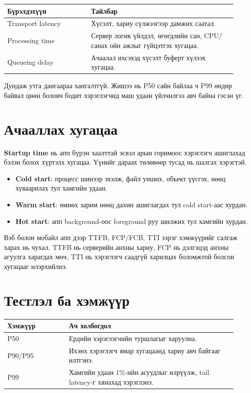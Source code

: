 \documentclass[10pt,a4paper,twocolumn]{article}
\begin{document}
\begin{tabular}{@{}p{0.34\linewidth}p{0.59\linewidth}@{}}
\toprule
\textbf{Бүрэлдэхүүн} & \textbf{Тайлбар} \\
\midrule
Transport latency & Хүсэлт, хариу сүлжээгээр дамжих саатал. \\
Processing time & Сервер логик үйлдэл, өгөгдлийн сан, CPU/санах ойн ажлыг гүйцэтгэх хугацаа. \\
Queueing delay & Ачаалал ихсэхэд хүсэлт буферт хүлээх хугацаа. \\
\bottomrule
\end{tabular}

Дундаж утга дангаараа хангалтгүй. Жишээ нь P50 сайн байлаа ч P99 өндөр байвал цөөн боловч бодит хэрэглэгчид маш удаан үйлчилгээ авч байна гэсэн үг.

\section{Ачааллах хугацаа}
\textbf{Startup time} нь апп бүрэн хаалттай эсвэл арын горимоос хэрэглэгч ашиглахад бэлэн болох хүртэлх хугацаа. Үүнийг дараах төлөвөөр тусад нь шалгах хэрэгтэй.

\begin{itemize}
  \item \textbf{Cold start}: процесс шинээр эхэлж, файл унших, объект үүсгэх, нөөц хуваарилах тул хамгийн удаан.
  \item \textbf{Warm start}: өмнөх зарим нөөц дахин ашиглагдах тул cold start-аас хурдан.
  \item \textbf{Hot start}: апп background-оос foreground руу шилжих тул хамгийн хурдан.
\end{itemize}

Вэб болон мобайл апп дээр TTFB, FCP/FCB, TTI зэрэг хэмжүүрийг салгаж харах нь чухал. TTFB нь серверийн анхны хариу, FCP нь дэлгэцэд анхны агуулга харагдах мөч, TTI нь хэрэглэгч саадгүй харилцах боломжтой болсон хугацааг илэрхийлнэ.

\section{Тестлэл ба хэмжүүр}
\begin{tabular}{@{}p{0.25\linewidth}p{0.68\linewidth}@{}}
\toprule
\textbf{Хэмжүүр} & \textbf{Ач холбогдол} \\
\midrule
P50 & Ердийн хэрэглэгчийн туршлагыг харуулна. \\
P90/P95 & Ихэнх хэрэглэгч ямар хугацаанд хариу авч байгааг илтгэнэ. \\
P99 & Хамгийн удаан 1\%-ийн асуудлыг илрүүлж, tail latency-г хянахад хэрэглэнэ. \\
\bottomrule
\end{tabular}
\end{document}
